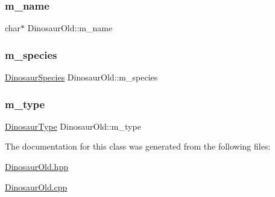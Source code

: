 \mbox{\label{classDinosaurOld_ace398a50a97047700049724b6e410e7a}} 
\subsubsection{\texorpdfstring{m\+\_\+name}{m\_name}}
{\footnotesize\ttfamily char$\ast$ Dinosaur\+Old\+::m\+\_\+name\hspace{0.3cm}{\ttfamily [private]}}

\mbox{\label{classDinosaurOld_a5d9ad9db7587e386f795a1ee9fa46cc2}} 
\subsubsection{\texorpdfstring{m\+\_\+species}{m\_species}}
{\footnotesize\ttfamily \hyperlink{DinosaurOld_8hpp_aef2140b5b57464fa283af86adcd6c5c1}{Dinosaur\+Species} Dinosaur\+Old\+::m\+\_\+species\hspace{0.3cm}{\ttfamily [private]}}

\mbox{\label{classDinosaurOld_a1ab0c1bee26852df8c537ede2fd11167}} 
\subsubsection{\texorpdfstring{m\+\_\+type}{m\_type}}
{\footnotesize\ttfamily \hyperlink{DinosaurOld_8hpp_a9f8d7b1c3f7b7d03f4101875fa35e8ea}{Dinosaur\+Type} Dinosaur\+Old\+::m\+\_\+type\hspace{0.3cm}{\ttfamily [private]}}



The documentation for this class was generated from the following files\+:\begin{DoxyCompactItemize}
\item 
\hyperlink{DinosaurOld_8hpp}{Dinosaur\+Old.\+hpp}\item 
\hyperlink{DinosaurOld_8cpp}{Dinosaur\+Old.\+cpp}\end{DoxyCompactItemize}
